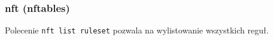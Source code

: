 % 
% 
% 
% 

\subsubsection{nft (nftables)}

Polecenie \Verb#nft list ruleset# pozwala na wylistowanie wszystkich reguł.

